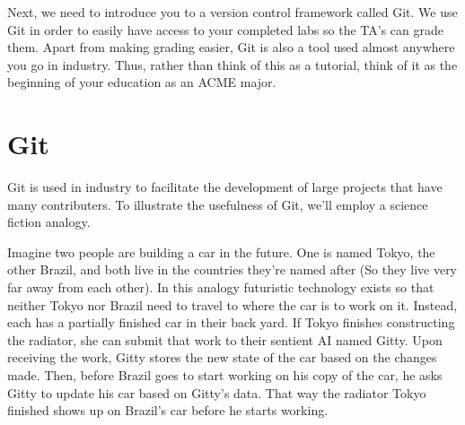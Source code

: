 Next, we need to introduce you to a version control framework called Git. We use Git in order to easily have access to your 
completed labs so the TA's can grade them. Apart from making grading easier, Git is also a tool used almost anywhere you go in industry. Thus, rather than think of this 
as a tutorial, think of it as the beginning of your education as an ACME major.

\section{Git}

Git is used in industry to facilitate the development of large projects that have many contributers. To illustrate the usefulness of Git, we'll employ
a science fiction analogy.

Imagine two people are building a car in the future. One is named Tokyo, the other Brazil, and both live in the countries they're named after (So they 
live very far away from each other). 
In this analogy futuristic technology exists so that neither Tokyo nor Brazil need to travel to where the car is to work on it. 
Instead, each has a partially finished car in their back yard. If Tokyo finishes constructing the radiator, she can submit 
that work to their sentient AI named Gitty. 
Upon receiving the work, Gitty stores the new state of the car based on the changes made. Then, before Brazil goes to start working on his copy of the car, 
he asks Gitty to update his car based on Gitty's data. That way the radiator Tokyo finished shows up on Brazil's car before he starts working. 

